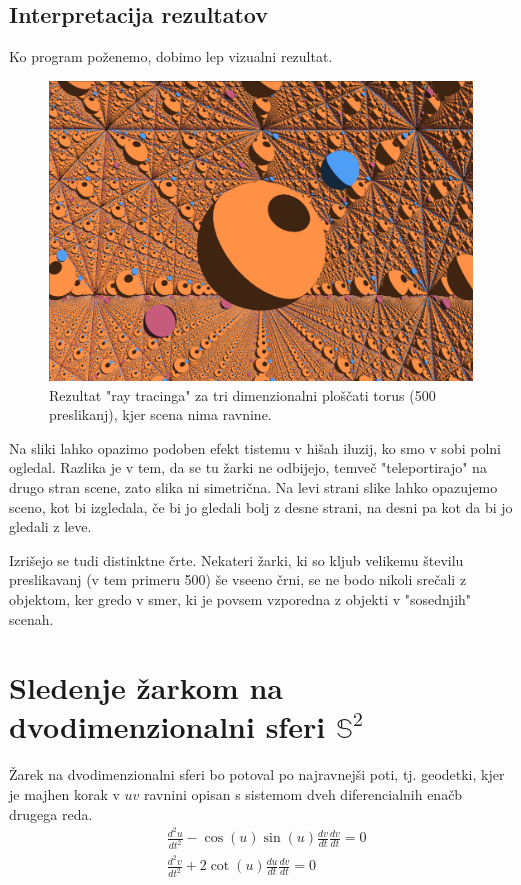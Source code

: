 \documentclass[titlepage]{article}
\begin{document}
\subsection{Interpretacija rezultatov}
Ko program poženemo, dobimo lep vizualni rezultat.
\begin{figure}[H]
    \centering
    \includegraphics[width=0.7\linewidth]{Images/flat_torus_24mm_500.png}
    \caption{Rezultat "ray tracinga" za tri dimenzionalni ploščati torus (500 preslikanj), kjer scena nima ravnine.}
    \label{Slika:Rezultat "ray tracinga" za tri dimenzionalni flat torus}
\end{figure}
Na sliki lahko opazimo podoben efekt tistemu v hišah iluzij, ko smo v sobi polni ogledal. Razlika je v tem, 
da se tu žarki ne odbijejo, temveč "teleportirajo" na drugo stran scene, zato slika ni simetrična. Na levi strani slike 
lahko opazujemo sceno, kot bi izgledala, če bi jo gledali bolj z desne strani, na desni pa kot da bi jo gledali z leve.

Izrišejo se tudi distinktne črte. Nekateri žarki, ki so kljub velikemu številu preslikavanj
(v tem primeru 500) še vseeno črni, se ne bodo nikoli srečali z objektom, ker gredo v smer, ki je povsem vzporedna
z objekti v "sosednjih" scenah.

\section{\texorpdfstring{Sledenje žarkom na dvodimenzionalni sferi \( \mathbb{S}^2 \)}{Sledenje žarkom na dvodimenzionalni sferi}}
Žarek na dvodimenzionalni sferi bo potoval po najravnejši poti, tj. geodetki, kjer je majhen korak v \( uv \) ravnini opisan s sistemom dveh diferencialnih enačb drugega reda.
\begin{equation}
    \begin{split}
        &\frac{d^{2}u}{dt^{2}}-\cos(u)\sin(u)\frac{dv}{dt}\frac{dv}{dt}=0 \\
        &\frac{d^{2}v}{dt^{2}}+2\cot(u)\frac{du}{dt}\frac{dv}{dt}=0
    \end{split}
\end{equation}
\end{document}

